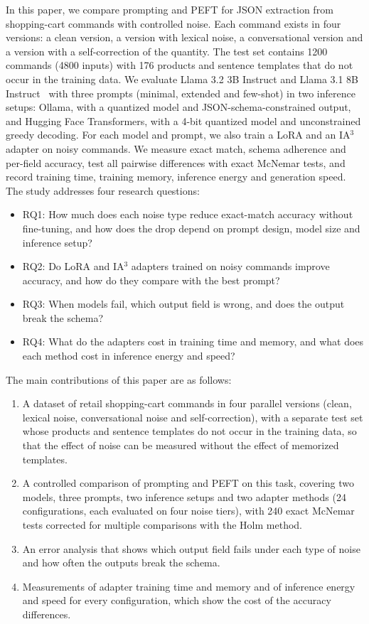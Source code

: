 \documentclass[journal,article,submit,pdftex,moreauthors]{Definitions/mdpi}
\begin{document}
In this paper, we compare prompting and PEFT for JSON extraction from shopping-cart commands with controlled noise. Each command exists in four versions: a clean version, a version with lexical noise, a conversational version and a version with a self-correction of the quantity. The test set contains 1200 commands (4800 inputs) with 176 products and sentence templates that do not occur in the training data. We evaluate Llama 3.2 3B Instruct and Llama 3.1 8B Instruct~\citep{grattafiori2024llama} with three prompts (minimal, extended and few-shot) in two inference setups: Ollama, with a quantized model and JSON-schema-constrained output, and Hugging Face Transformers, with a 4-bit quantized model and unconstrained greedy decoding. For each model and prompt, we also train a LoRA and an IA$^3$ adapter on noisy commands. We measure exact match, schema adherence and per-field accuracy, test all pairwise differences with exact McNemar tests, and record training time, training memory, inference energy and generation speed. The study addresses four research questions:

\begin{itemize}
\item RQ1: How much does each noise type reduce exact-match accuracy without fine-tuning, and how does the drop depend on prompt design, model size and inference setup?
\item RQ2: Do LoRA and IA$^3$ adapters trained on noisy commands improve accuracy, and how do they compare with the best prompt?
\item RQ3: When models fail, which output field is wrong, and does the output break the schema?
\item RQ4: What do the adapters cost in training time and memory, and what does each method cost in inference energy and speed?
\end{itemize}


The main contributions of this paper are as follows:

\begin{enumerate}
\item A dataset of retail shopping-cart commands in four parallel versions (clean, lexical noise, conversational noise and self-correction), with a separate test set whose products and sentence templates do not occur in the training data, so that the effect of noise can be measured without the effect of memorized templates.
\item A controlled comparison of prompting and PEFT on this task, covering two models, three prompts, two inference setups and two adapter methods (24 configurations, each evaluated on four noise tiers), with 240 exact McNemar tests corrected for multiple comparisons with the Holm method.
\item An error analysis that shows which output field fails under each type of noise and how often the outputs break the schema.
\item Measurements of adapter training time and memory and of inference energy and speed for every configuration, which show the cost of the accuracy differences.
\end{enumerate}
\end{document}
